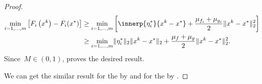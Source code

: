 \documentclass[../../main]{subfiles}
\begin{document}
\begin{proof}
\begin{equation}
        \begin{aligned}
            \min_{i = 1, \dots, m} \left[ F_i\left(x^k\right) - F_i(x^*) \right] & \ge \min_{i = 1, \dots, m} \left[  \innerp{\eta_i^*}{x^k - x^*} + \frac{\mu_{f_i} + \mu_{g_i}}{2} \norm{x^k - x^*}_2^2 \right] \\
                                                                                 & \ge \min_{i = 1, \dots, m} \norm{\eta_i^*}_2 \norm{x^k - x^*}_2 + \frac{\mu_f + \mu_g}{2} \norm{x^k - x^*}_2^2
            .\end{aligned}
    \end{equation}
    Since~$M \in (0, 1)$,  proves the desired result.

    We can get the similar result for the  by  and for the  by .
\end{proof}
\end{document}
